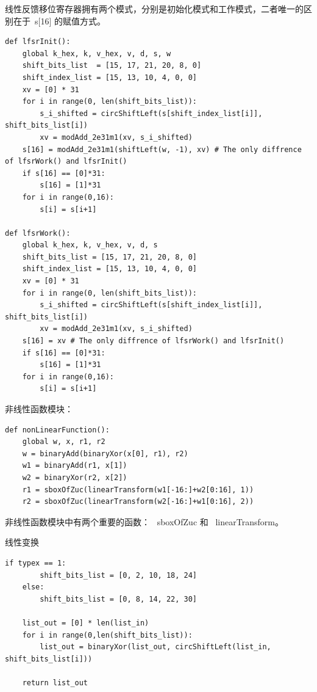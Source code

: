 线性反馈移位寄存器拥有两个模式，分别是初始化模式和工作模式，二者唯一的区别在于\ {\cnsls s[16]} 的赋值方式。

\begin{lstlisting}[style=myPython,label={lst:lfsr},caption={线性反馈移位寄存器的初始化模式和工作模式}]
def lfsrInit():
    global k_hex, k, v_hex, v, d, s, w
    shift_bits_list  = [15, 17, 21, 20, 8, 0]
    shift_index_list = [15, 13, 10, 4, 0, 0]
    xv = [0] * 31
    for i in range(0, len(shift_bits_list)):
        s_i_shifted = circShiftLeft(s[shift_index_list[i]], shift_bits_list[i])
        xv = modAdd_2e31m1(xv, s_i_shifted)
    s[16] = modAdd_2e31m1(shiftLeft(w, -1), xv) # The only diffrence of lfsrWork() and lfsrInit()
    if s[16] == [0]*31:
        s[16] = [1]*31
    for i in range(0,16):
        s[i] = s[i+1]

def lfsrWork():
    global k_hex, k, v_hex, v, d, s
    shift_bits_list = [15, 17, 21, 20, 8, 0]
    shift_index_list = [15, 13, 10, 4, 0, 0]
    xv = [0] * 31
    for i in range(0, len(shift_bits_list)):
        s_i_shifted = circShiftLeft(s[shift_index_list[i]], shift_bits_list[i])
        xv = modAdd_2e31m1(xv, s_i_shifted)
    s[16] = xv # The only diffrence of lfsrWork() and lfsrInit()
    if s[16] == [0]*31:
        s[16] = [1]*31
    for i in range(0,16):
        s[i] = s[i+1]
\end{lstlisting}


非线性函数模块：

\begin{lstlisting}[style=myPython,label={lst:nonlinearfunction},caption={非线性函数}]
def nonLinearFunction():
    global w, x, r1, r2
    w = binaryAdd(binaryXor(x[0], r1), r2)
    w1 = binaryAdd(r1, x[1])
    w2 = binaryXor(r2, x[2])
    r1 = sboxOfZuc(linearTransform(w1[-16:]+w2[0:16], 1))
    r2 = sboxOfZuc(linearTransform(w2[-16:]+w1[0:16], 2))
\end{lstlisting}

非线性函数模块中有两个重要的函数：\  {\color{red} {\cnsls sboxOfZuc}} 和\ {\color{red} {\cnsls linearTransform}}。



线性变换

\begin{lstlisting}[style=myPython,label={lst:lineartransform},caption={线性变换函数}]
    if typex == 1:
        shift_bits_list = [0, 2, 10, 18, 24]
    else:
        shift_bits_list = [0, 8, 14, 22, 30]

    list_out = [0] * len(list_in)
    for i in range(0,len(shift_bits_list)):
        list_out = binaryXor(list_out, circShiftLeft(list_in, shift_bits_list[i]))

    return list_out
\end{lstlisting}


